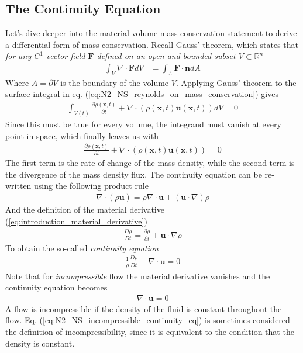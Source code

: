 \documentclass[a4paper, 12pt]{article}
\numberwithin{equation}{subsubsection}
\begin{document}
\subsection{The Continuity Equation}
Let's dive deeper into the material volume mass conservation statement to derive a differential form of mass conservation. Recall Gauss' theorem, which states that \textit{for any $C^1$ vector field $\mathbf{F}$ defined on an open and bounded subset $V \subset \mathbb{R}^n$}
\begin{align}
	\int_V \nabla \cdot \mathbf{F} dV &= \int_{A} \mathbf{F} \cdot \mathbf{n} dA
\end{align}
Where $A = \partial V$ is the boundary of the volume $V$. Applying Gauss' theorem to the surface integral in eq. (\ref{eq:N2_NS_reynolds_on_mass_conservation}) gives
\begin{align}
	\int_{V(t)} \frac{\partial \rho (\mathbf{x}, t)}{\partial t} + \nabla \cdot (\rho(\mathbf{x}, t) \mathbf{u}(\mathbf{x}, t)) dV = 0
\end{align}
Since this must be true for every volume, the integrand must vanish at every point in space, which finally leaves us with
\begin{align}
	\frac{\partial \rho (\mathbf{x}, t)}{\partial t} + \nabla \cdot (\rho(\mathbf{x}, t) \mathbf{u}(\mathbf{x}, t)) = 0
\end{align}
The first term is the rate of change of the mass density, while the second term is the divergence of the mass density flux. The continuity equation can be re-written using the following product rule
\begin{align*}
	\nabla \cdot (\rho \mathbf{u}) = \rho \nabla \cdot \mathbf{u} + (\mathbf{u} \cdot \nabla) \rho
\end{align*}
And the definition of the material derivative (\ref{eq:introduction_material_derivative})
\begin{align*}
	\frac{D \rho}{D t} = \frac{\partial \rho}{\partial t} + \mathbf{u} \cdot \nabla \rho
\end{align*}
To obtain the so-called \textit{continuity equation}
\begin{align}
	\frac{1}{\rho} \frac{D \rho}{D t} + \nabla \cdot \mathbf{u} = 0 \label{eq:N2_NS_continuity_eq}
\end{align}
Note that for \textit{incompressible} flow the material derivative vanishes and the continuity equation becomes
\begin{align}
	\nabla \cdot \mathbf{u} = 0 \label{eq:N2_NS_incompressible_continuity_eq}
\end{align}
A flow is incompressible if the density of the fluid is constant throughout the flow. Eq. (\ref{eq:N2_NS_incompressible_continuity_eq}) is sometimes considered the definition of incompressibility, since it is equivalent to the condition that the density is constant.
\end{document}
